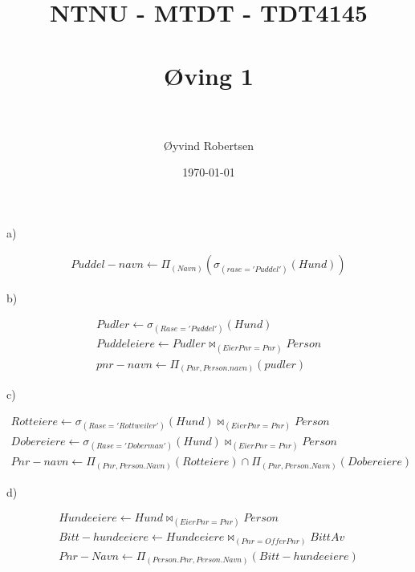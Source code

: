\documentclass[paper=a4, fontsize=11pt]{scrartcl} %
\title{%
\normalfont \normalsize
\textsc{NTNU - MTDT - TDT4145} \\ [25pt] %
\horrule{0.5pt} \\[0.4cm] %
\huge {Øving 1} \\ %
\horrule{2pt} \\[0.5cm] %
}
\author{Øyvind Robertsen} %
\date{\normalsize\today} %
\numberwithin{equation}{section} %
\numberwithin{figure}{section} %
\numberwithin{table}{section} %
\begin{document}
a)

\begin{gather*}
Puddel-navn \leftarrow \Pi_{(Navn)}(\sigma_{(rase='Puddel')}(Hund))
\end{gather*}


b)

\begin{gather*}
Pudler \leftarrow \sigma_{(Rase='Puddel')}(Hund) \\
Puddeleiere \leftarrow Pudler \bowtie_{(EierPnr=Pnr)} Person\\
pnr-navn \leftarrow \Pi_{(Pnr, Person.navn)}(pudler)
\end{gather*}


c)

\begin{gather*}
Rotteiere \leftarrow \sigma_{(Rase='Rottweiler')}(Hund) \bowtie_{(EierPnr=Pnr)} Person\\
Dobereiere \leftarrow \sigma_{(Rase='Doberman')}(Hund) \bowtie_{(EierPnr=Pnr)} Person\\
Pnr-navn \leftarrow \Pi_{(Pnr, Person.Navn)}(Rotteiere) \cap \Pi_{(Pnr, Person.Navn)}(Dobereiere)
\end{gather*}

d)

\begin{gather*}
Hundeeiere \leftarrow Hund \bowtie_{(EierPnr=Pnr)} Person\\
Bitt-hundeeiere \leftarrow Hundeeiere \bowtie_{(Pnr=OfferPnr)} BittAv\\
Pnr-Navn \leftarrow \Pi_{(Person.Pnr, Person.Navn)}(Bitt-hundeeiere)
\end{gather*}
\end{document}
